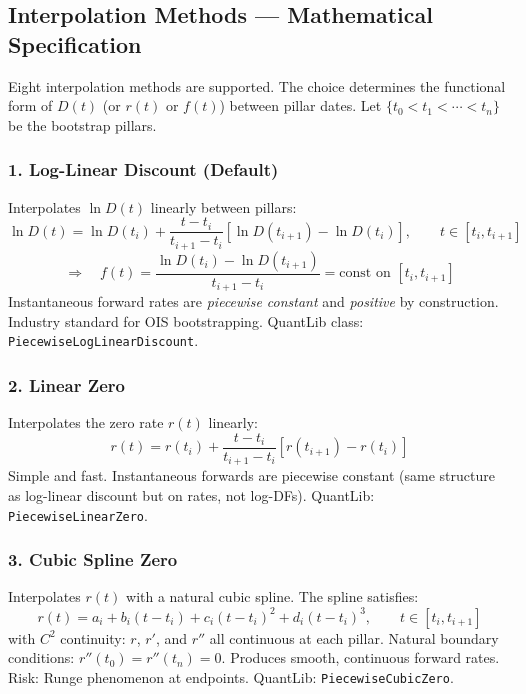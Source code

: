 \documentclass[11pt, a4paper]{article}
\begin{document}
\subsection{Interpolation Methods — Mathematical Specification}

Eight interpolation methods are supported. The choice determines the functional
form of $D(t)$ (or $r(t)$ or $f(t)$) between pillar dates.
Let $\{t_0 < t_1 < \cdots < t_n\}$ be the bootstrap pillars.

\subsubsection{1. Log-Linear Discount (Default)}

Interpolates $\ln D(t)$ linearly between pillars:
\begin{equation}
  \ln D(t) = \ln D(t_i) + \frac{t - t_i}{t_{i+1} - t_i}
             \left[\ln D(t_{i+1}) - \ln D(t_i)\right],
  \qquad t \in [t_i, t_{i+1}]
\end{equation}
\begin{equation}
  \Longrightarrow \quad f(t) = \frac{\ln D(t_i) - \ln D(t_{i+1})}{t_{i+1} - t_i}
  = \text{const on } [t_i, t_{i+1}]
\end{equation}
Instantaneous forward rates are \emph{piecewise constant} and \emph{positive} by construction.
Industry standard for OIS bootstrapping. QuantLib class: \texttt{PiecewiseLogLinearDiscount}.

\subsubsection{2. Linear Zero}

Interpolates the zero rate $r(t)$ linearly:
\begin{equation}
  r(t) = r(t_i) + \frac{t-t_i}{t_{i+1}-t_i}\left[r(t_{i+1})-r(t_i)\right]
\end{equation}
Simple and fast. Instantaneous forwards are piecewise constant (same structure as
log-linear discount but on rates, not log-DFs). QuantLib: \texttt{PiecewiseLinearZero}.

\subsubsection{3. Cubic Spline Zero}

Interpolates $r(t)$ with a natural cubic spline. The spline satisfies:
\begin{equation}
  r(t) = a_i + b_i(t-t_i) + c_i(t-t_i)^2 + d_i(t-t_i)^3,
  \qquad t \in [t_i, t_{i+1}]
\end{equation}
with $C^2$ continuity: $r$, $r'$, and $r''$ all continuous at each pillar.
Natural boundary conditions: $r''(t_0) = r''(t_n) = 0$.
Produces smooth, continuous forward rates. Risk: Runge phenomenon at endpoints.
QuantLib: \texttt{PiecewiseCubicZero}.
\end{document}
